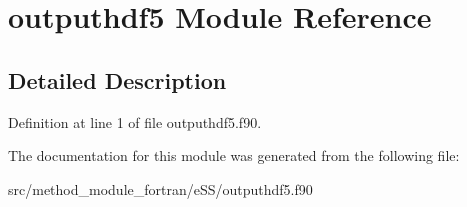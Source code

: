 \hypertarget{classoutputhdf5}{\section{outputhdf5 Module Reference}
\label{classoutputhdf5}
}


\subsection{Detailed Description}


Definition at line 1 of file outputhdf5.\-f90.



The documentation for this module was generated from the following file\-:\begin{DoxyCompactItemize}
\item 
src/method\-\_\-module\-\_\-fortran/e\-S\-S/outputhdf5.\-f90\end{DoxyCompactItemize}
